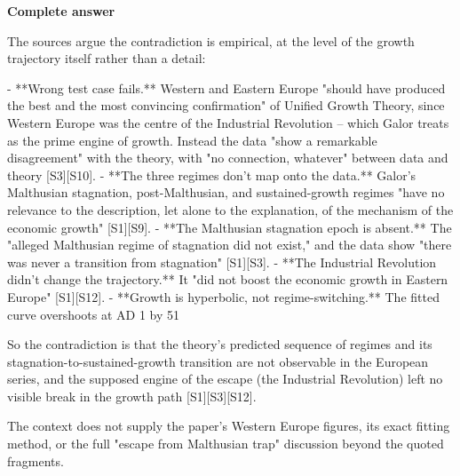 \documentclass[10pt]{article}
\begin{document}
\textbf{Complete answer}
\begin{AnswerText}
The sources argue the contradiction is empirical, at the level of the growth trajectory itself rather than a detail:

- **Wrong test case fails.** Western and Eastern Europe "should have produced the best and the most convincing confirmation" of Unified Growth Theory, since Western Europe was the centre of the Industrial Revolution -- which Galor treats as the prime engine of growth. Instead the data "show a remarkable disagreement" with the theory, with "no connection, whatever" between data and theory [S3][S10].
- **The three regimes don't map onto the data.** Galor's Malthusian stagnation, post-Malthusian, and sustained-growth regimes "have no relevance to the description, let alone to the explanation, of the mechanism of the economic growth" [S1][S9].
- **The Malthusian stagnation epoch is absent.** The "alleged Malthusian regime of stagnation did not exist," and the data show "there was never a transition from stagnation" [S1][S3].
- **The Industrial Revolution didn't change the trajectory.** It "did not boost the economic growth in Eastern Europe" [S1][S12].
- **Growth is hyperbolic, not regime-switching.** The fitted curve overshoots at AD 1 by 51%

So the contradiction is that the theory's predicted sequence of regimes and its stagnation-to-sustained-growth transition are not observable in the European series, and the supposed engine of the escape (the Industrial Revolution) left no visible break in the growth path [S1][S3][S12].

The context does not supply the paper's Western Europe figures, its exact fitting method, or the full "escape from Malthusian trap" discussion beyond the quoted fragments.
\end{AnswerText}
\end{document}
